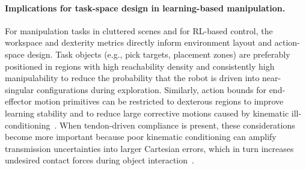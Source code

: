 \paragraph{Implications for task-space design in learning-based manipulation.}
For manipulation tasks in cluttered scenes and for \ac{RL}-based control, the workspace and dexterity metrics directly inform environment layout and action-space design. Task objects (e.g., pick targets, placement zones) are preferably positioned in regions with high reachability density and consistently high manipulability to reduce the probability that the robot is driven into near-singular configurations during exploration. Similarly, action bounds for end-effector motion primitives can be restricted to dexterous regions to improve learning stability and to reduce large corrective motions caused by kinematic ill-conditioning~\cite{Yoshikawa1985Manipulability,Salisbury1982ArticulatedHands,Dong2013WorkspaceDensity}. When tendon-driven compliance is present, these considerations become more important because poor kinematic conditioning can amplify transmission uncertainties into larger Cartesian errors, which in turn increases undesired contact forces during object interaction~\cite{Miyasaka2020HysteresisFriction,Bicchi2004FastSoftArm}.



